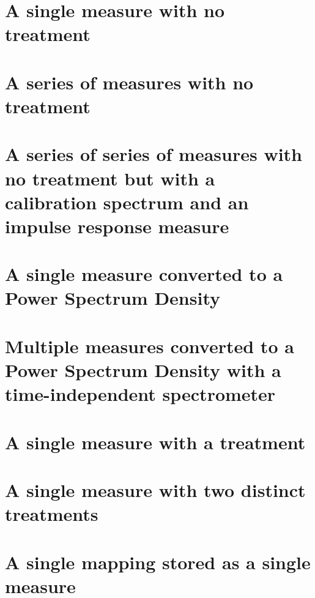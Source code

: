 \documentclass{book}
\begin{document}
    \section{A single measure with no treatment}
        
    
    \section{A series of measures with no treatment}
        
    
    \section{A series of series of measures with no treatment but with a calibration spectrum and an impulse response measure}
        
    
    \section{A single measure converted to a Power Spectrum Density}
        
    
    \section{Multiple measures converted to a Power Spectrum Density with a time-independent spectrometer}
        

    \section{A single measure with a treatment}
        
    
    \section{A single measure with two distinct treatments}
        

    \section{A single mapping stored as a single measure}
        
    
\end{document}
